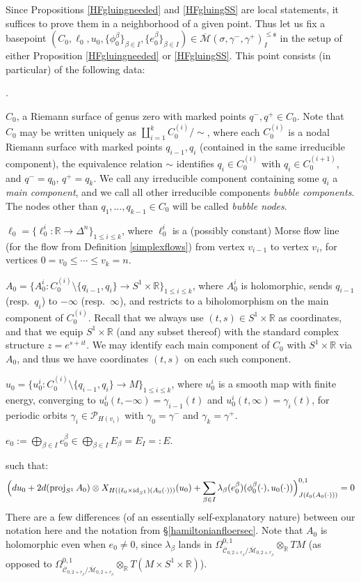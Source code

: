 \documentclass[12pt]{article}
\theoremstyle{definition}
\theoremstyle{remark}
\numberwithin{equation}{subsection}
\newcommand{\s}{\mathfrak s}
\newcommand{\RR}{\mathbb R}
\newcommand{\PPP}{\mathcal P}
\newcommand{\proj}{\operatorname{proj}}
\newcommand{\Mbar}{\overline{\mathcal M}}
\newcommand{\Cbar}{\overline{\mathcal C}}
\newcommand{\id}{\operatorname{id}}
\newcounter{rcounti}
\newenvironment{rlist}{\begin{list}{\roman{rcounti}.}{\usecounter{rcounti}
\setlength\itemsep{0pt}
\setlength\labelsep{4pt}
\setlength\labelwidth{16pt}
\setlength\leftmargin{32pt}
\setlength\listparindent{0pt}
\setlength\parsep{0pt}
\setlength\parskip{0pt}
\setlength\partopsep{0pt}
\setlength\rightmargin{0pt}
\setlength\topsep{0pt}
\setlength\itemindent{0pt}
}}{\end{list}}
\begin{document}
Since Propositions \ref{HFgluingneeded} and \ref{HFgluingSS} are local statements, it suffices to prove them in a neighborhood of a given point.  Thus let us fix a basepoint $(C_0,\ell_0,u_0,\{\phi^\beta_0\}_{\beta\in I},\{e^\beta_0\}_{\beta\in I})\in\Mbar(\sigma,\gamma^-,\gamma^+)^{\leq\s}_I$ in the setup of either Proposition \ref{HFgluingneeded} or \ref{HFgluingSS}.  This point consists (in particular) of the following data:
\begin{rlist}
\item $C_0$, a Riemann surface of genus zero with marked points $q^-,q^+\in C_0$.  Note that $C_0$ may be written uniquely as ${\coprod_{i=1}^kC_0^{(i)}}/{\sim}$, where each $C_0^{(i)}$ is a nodal Riemann surface with marked points $q_{i-1},q_i$ (contained in the same irreducible component), the equivalence relation $\sim$ identifies $q_i\in C_0^{(i)}$ with $q_i\in C_0^{(i+1)}$, and $q^-=q_0$, $q^+=q_k$.  We call any irreducible component containing some $q_i$ a \emph{main component}, and we call all other irreducible components \emph{bubble components}.  The nodes other than $q_1,\ldots,q_{k-1}\in C_0$ will be called \emph{bubble nodes}.
\item $\ell_0=\{\ell_0^i:\RR\to\Delta^n\}_{1\leq i\leq k}$, where $\ell_0^i$ is a (possibly constant) Morse flow line (for the flow from Definition \ref{simplexflows}) from vertex $v_{i-1}$ to vertex $v_i$, for vertices $0=v_0\leq\cdots\leq v_k=n$.
\item $A_0=\{A_0^i:C_0^{(i)}\setminus\{q_{i-1},q_i\}\to S^1\times\RR\}_{1\leq i\leq k}$, where $A_0^i$ is holomorphic, sends $q_{i-1}$ (resp.\ $q_i$) to $-\infty$ (resp.\ $\infty$), and restricts to a biholomorphism on the main component of $C_0^{(i)}$.  Recall that we always use $(t,s)\in S^1\times\RR$ as coordinates, and that we equip $S^1\times\RR$ (and any subset thereof) with the standard complex structure $z=e^{s+it}$.  We may identify each main component of $C_0$ with $S^1\times\RR$ via $A_0$, and thus we have coordinates $(t,s)$ on each such component.
\item $u_0=\{u_0^i:C_0^{(i)}\setminus\{q_{i-1},q_i\}\to M\}_{1\leq i\leq k}$, where $u_0^i$ is a smooth map with finite energy, converging to $u_0^i(t,-\infty)=\gamma_{i-1}(t)$ and $u_0^i(t,\infty)=\gamma_i(t)$, for periodic orbits $\gamma_i\in\PPP_{H(v_i)}$ with $\gamma_0=\gamma^-$ and $\gamma_k=\gamma^+$.
\item $e_0:=\bigoplus_{\beta\in I}e^\beta_0\in\bigoplus_{\beta\in I}E_\beta=E_I=:E$.
\end{rlist}
such that:
\begin{equation}
\Bigl(du_0+2d(\proj_{S^1}A_0)\otimes X_{H((\ell_0\times\id_{S^1})(A_0(\cdot)))}(u_0)+\sum_{\beta\in I}\lambda_\beta(e^\beta_0)(\phi^\beta_0(\cdot),u_0(\cdot))\Bigr)^{0,1}_{J(\ell_0(A_0(\cdot)))}=0
\end{equation}
There are a few differences (of an essentially self-explanatory nature) between our notation here and the notation from \S\ref{hamiltonianfloersec}.  Note that $A_0$ is holomorphic even when $e_0\ne 0$, since $\lambda_\beta$ lands in $\Omega^{0,1}_{\Cbar_{0,2+r_\beta}/\Mbar_{0,2+r_\beta}}\otimes_\RR TM$ (as opposed to $\Omega^{0,1}_{\Cbar_{0,2+r_\beta}/\Mbar_{0,2+r_\beta}}\otimes_\RR T(M\times S^1\times\RR)$).
\end{document}
